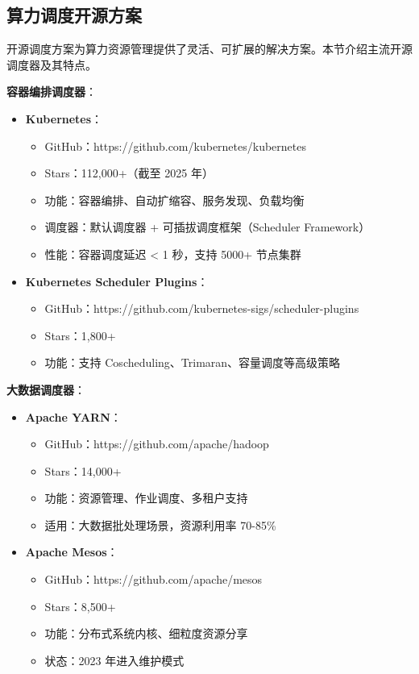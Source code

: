 \documentclass[12pt,a4paper]{article}
\begin{document}
\subsection{算力调度开源方案}

开源调度方案为算力资源管理提供了灵活、可扩展的解决方案。本节介绍主流开源调度器及其特点。

\textbf{容器编排调度器}：

\begin{itemize}
    \item \textbf{Kubernetes}：
    \begin{itemize}
        \item GitHub：https://github.com/kubernetes/kubernetes
        \item Stars：112,000+（截至 2025 年）
        \item 功能：容器编排、自动扩缩容、服务发现、负载均衡
        \item 调度器：默认调度器 + 可插拔调度框架（Scheduler Framework）
        \item 性能：容器调度延迟 < 1 秒，支持 5000+ 节点集群
    \end{itemize}
    
    \item \textbf{Kubernetes Scheduler Plugins}：
    \begin{itemize}
        \item GitHub：https://github.com/kubernetes-sigs/scheduler-plugins
        \item Stars：1,800+
        \item 功能：支持 Coscheduling、Trimaran、容量调度等高级策略
    \end{itemize}
\end{itemize}

\textbf{大数据调度器}：

\begin{itemize}
    \item \textbf{Apache YARN}：
    \begin{itemize}
        \item GitHub：https://github.com/apache/hadoop
        \item Stars：14,000+
        \item 功能：资源管理、作业调度、多租户支持
        \item 适用：大数据批处理场景，资源利用率 70-85\%
    \end{itemize}
    
    \item \textbf{Apache Mesos}：
    \begin{itemize}
        \item GitHub：https://github.com/apache/mesos
        \item Stars：8,500+
        \item 功能：分布式系统内核、细粒度资源分享
        \item 状态：2023 年进入维护模式
    \end{itemize}
\end{itemize}
\end{document}
